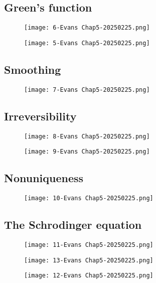 \subsection{Green's function}

\begin{figure}[H]
\centering
\texttt{[image: 6-Evans Chap5-20250225.png]}
\label{}
\end{figure}
\begin{figure}[H]
\centering
\texttt{[image: 5-Evans Chap5-20250225.png]}
\label{}
\end{figure}

\subsection{Smoothing}

\begin{figure}[H]
\centering
\texttt{[image: 7-Evans Chap5-20250225.png]}
\label{}
\end{figure}

\subsection{Irreversibility}

\begin{figure}[H]
\centering
\texttt{[image: 8-Evans Chap5-20250225.png]}
\label{}
\end{figure}
\begin{figure}[H]
\centering
\texttt{[image: 9-Evans Chap5-20250225.png]}
\label{}
\end{figure}

\subsection{Nonuniqueness}

\begin{figure}[H]
\centering
\texttt{[image: 10-Evans Chap5-20250225.png]}
\label{}
\end{figure}

\subsection{The Schrodinger equation}

\begin{figure}[H]
\centering
\texttt{[image: 11-Evans Chap5-20250225.png]}
\label{}
\end{figure}
\begin{figure}[H]
\centering
\texttt{[image: 13-Evans Chap5-20250225.png]}
\label{}
\end{figure}
\begin{figure}[H]
\centering
\texttt{[image: 12-Evans Chap5-20250225.png]}
\label{}
\end{figure}

